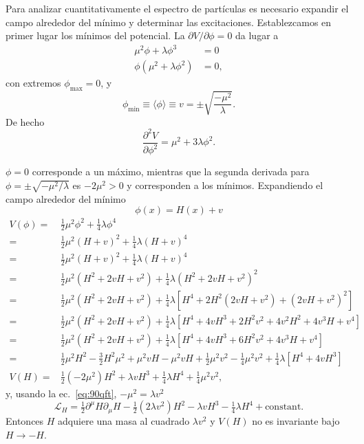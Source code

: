 \begin{frame}
Para analizar cuantitativamente el espectro de partículas es necesario expandir el campo alrededor del mínimo y determinar las excitaciones. Establezcamos en primer lugar los mínimos del potencial. La $\partial V/\partial\phi=0$ da lugar a
\begin{align}
  \mu^2\phi+\lambda\phi^3&=0\\
  \phi(\mu^2+\lambda\phi^2)&=0,
\end{align}
con extremos $\phi_{\text{max}}=0$, y 
\begin{equation}
  \label{eq:90qft}
  \phi_{\text{min}}\equiv\langle\phi\rangle\equiv v=\pm\sqrt{\frac{-\mu^2}{\lambda}}.
\end{equation}
De hecho 
\begin{equation}
  \frac{\partial^2V}{\partial\phi^2}=\mu^2+3\lambda\phi^2.
\end{equation}
\end{frame}
$\phi=0$ corresponde a un máximo, mientras que la segunda derivada para $\phi=\pm\sqrt{-\mu^2/\lambda}$ es $-2\mu^2\gt 0$ y corresponden a los mínimos. Expandiendo el campo alrededor del mínimo
\begin{equation}
  \phi(x)=H(x)+v
\end{equation}
\begin{align}
  V(\phi)=&\tfrac{1}{2}\mu^2 \phi^2+\tfrac{1}{4}\lambda\phi^4\nonumber\\
  =&\tfrac{1}{2}\mu^2 (H+v)^2+\tfrac{1}{4}\lambda(H+v)^4\nonumber\\
  =&\tfrac{1}{2}\mu^2 (H+v)^2+\tfrac{1}{4}\lambda(H+v)^4\nonumber\\
  =&\tfrac{1}{2}\mu^2 \left(H^2+2vH+v^2\right)+\tfrac{1}{4}\lambda\left(H^2+2vH+v^2\right)^2\nonumber\\
  =&\tfrac{1}{2}\mu^2 \left(H^2+2vH+v^2\right)+\tfrac{1}{4}\lambda\left[H^4+2H^2\left(2vH+v^2\right)+\left(2vH+v^2\right)^2\right]\nonumber\\
  =&\tfrac{1}{2}\mu^2 \left(H^2+2vH+v^2\right)+\tfrac{1}{4}\lambda\left[H^4+4vH^3+2H^2v^2+4v^2H^2+4v^3H+v^4\right]\nonumber\\
  =&\tfrac{1}{2}\mu^2 \left(H^2+2vH+v^2\right)+\tfrac{1}{4}\lambda\left[H^4+4vH^3+6H^2v^2+4v^3H+v^4\right]\nonumber\\
  =&\tfrac{1}{2}\mu^2H^2-\tfrac{3}{2}H^2\mu^2+\mu^2vH-\mu^2vH+\tfrac{1}{2}\mu^2v^2-\tfrac{1}{4}\mu^2v^2+\tfrac{1}{4}\lambda\left[H^4+4vH^3\right]\nonumber\\
\label{eq:84qft}
V(H)=&\tfrac{1}{2}\left(-2\mu^2\right)H^2+\lambda vH^3+\tfrac{1}{4}\lambda H^4+\tfrac{1}{4}\mu^2v^2,
\end{align}
y, usando la ec.~\eqref{eq:90qft}, $-\mu^{2}=\lambda v^2$
\begin{equation}
  \label{eq:88qft}
  \mathcal{L}_H=\tfrac{1}{2}\partial^\mu H\partial_\mu H-\tfrac{1}{2}\left(2\lambda v^{2}\right)H^2-\lambda vH^3-\tfrac{1}{4}\lambda H^4+\text{constant}.
\end{equation}
Entonces $H$ adquiere una masa al cuadrado $\lambda v^{2}$ y $V(H)$ no es invariante bajo $H\to-H$. 

